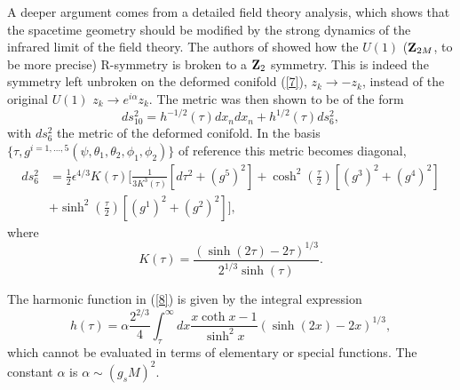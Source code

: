 \documentclass[12pt,epsf,a4paper]{article}
\begin{document}
A deeper argument comes from a detailed field theory analysis, which shows that the 
spacetime geometry should be modified by the strong dynamics of the infrared limit of 
the field theory. The authors of \cite{KS} showed how the $U(1)$ (${\bf Z}_{2M}$, to be 
more precise) R-symmetry is broken to a ${\bf Z}_2$ symmetry. This is indeed the symmetry 
left unbroken on the deformed conifold (\ref{7}), $z_k \rightarrow - z_k$, instead of the 
original $U(1)$ $z_k \rightarrow e^{i \alpha} z_k$. The metric was then shown to be of 
the form 
\begin{equation}
ds_{10}^2 = h^{-1/2} (\tau) dx_n dx_n + h^{1/2} (\tau) ds_6^2,
\label{8}
\end{equation}
with $ds_6^2$ the metric of the deformed conifold. In the basis $\{\tau, g^{i=1,\ldots,5} 
(\psi,\theta_1,\theta_2,\phi_1,\phi_2) \}$ of reference  
\cite{Minasian} this metric becomes diagonal,
\begin{equation}
\begin{split}
ds_6^2 &= \frac {1}{2} \epsilon^{4/3} K(\tau) \Big[ \frac {1}{3 K^3(\tau)} [d \tau^2 
+ (g^5)^2] + \cosh^2 \left( \frac {\tau}{2} \right) [(g^3)^2 + (g^4)^2]  \\
&+ \sinh^2 \left( \frac {\tau}{2} \right) [(g^1)^2+(g^2)^2]  \Big],
\label{9}
\end{split}
\end{equation}
where
\begin{equation}
K(\tau) = \frac {(\sinh(2 \tau)-2 \tau)^{1/3}}{2^{1/3} \sinh(\tau)}.
\label{10}
\end{equation}
    
The harmonic function in (\ref{8}) is given by the integral expression 
\begin{equation}
h(\tau) = \alpha \frac {2^{2/3}}{4} \int_{\tau}^{\infty} dx \frac {x \coth x -1}{\sinh^2 x}
(\sinh(2x)-2x)^{1/3},
\label{13}
\end{equation}
which  cannot be evaluated in terms of elementary or special functions. The constant 
$\alpha$ is $\alpha \sim (g_s M)^2$.
  
\end{document}
